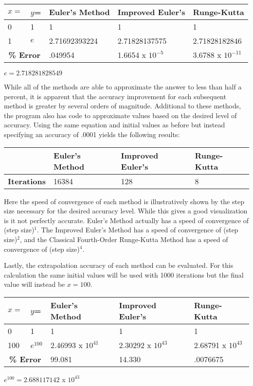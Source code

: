 \documentclass[12pt, letterpaper]{report}
\begin{document}
\begin{center}
\begin{tabular}{|l|l|l|l|l|}
    \hline
    \(x=\) & \(y\)= & Euler's Method & Improved Euler's & Runge-Kutta \\
    \hline
    0 & 1 & 1 & 1 & 1 \\
    \hline
    1 & \(e\) & 2.71692393224 & 2.71828137575 & 2.71828182846 \\
    \hline
    \multicolumn{2}{|c|}{\textbf{\% Error}} & .049954 & 1.6654 x \(10^{-5}\) & 3.6788 x \(10^{-11}\) \\
    \hline
\end{tabular}
\(e=2.718281828549\)
\end{center}

While all of the methods are able to approximate the answer to less than half a percent, it is apparent that the accuracy improvement for each subsequent method is greater by several orders of magnitude.
\newpage
Additional to these methods, the program also has code to approximate values based on the desired level of accuracy. Using the same equation and initial values as before but instead specifying an accuracy of .0001 yields the following results:

\begin{center}
\begin{tabular}{|l|l|l|l|l|}
    \hline
    \multicolumn{2}{|c|}{} & Euler's Method & Improved Euler's & Runge-Kutta \\
    \hline
    \multicolumn{2}{|c|}{\textbf{Iterations}} & 16384 & 128 & 8 \\
    \hline
\end{tabular}
\end{center}

Here the speed of convergence of each method is illustratively shown by the step size necessary for the desired accuracy level. While this gives a good visualization is it not perfectly accurate. Euler's Method actually has a speed of convergence of (step size)\(^1\). The Improved Euler's Method has a speed of convergence of (step size)\(^2\), and the Classical Fourth-Order Runge-Kutta Method has a speed of convergence of (step size)\(^4\).

Lastly, the extrapolation accuracy of each method can be evaluated. For this calculation the same initial values will be used with 1000 iterations but the final value will instead be \(x=100\).

\begin{center}
\begin{tabular}{|l|l|l|l|l|}
    \hline
    \(x=\) & \(y\)= & Euler's Method & Improved Euler's & Runge-Kutta \\
    \hline
    0 & 1 & 1 & 1 & 1 \\
    \hline
    100 & \(e^{100}\) & 2.46993 x \(10^{41}\) & 2.30292 x \(10^{43}\) & 2.68791 x \(10^{43}\) \\
    \hline
    \multicolumn{2}{|c|}{\textbf{\% Error}} & 99.081 & 14.330 & .0076675 \\
    \hline
\end{tabular}
\(e^{100}=2.688117142\) x \(10^{43}\)
\end{center}
\end{document}
